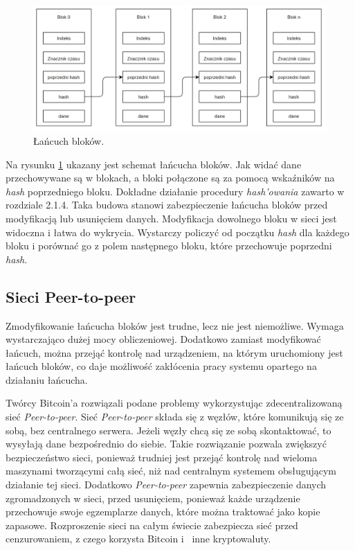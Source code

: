 \documentclass[a4paper,12pt]{book}
\begin{document}
\begin{figure}[h]
	\centering
	\includegraphics[width=\textwidth]{images/łańcuch_bloków.jpg}
	\caption {Łańcuch bloków.}\label{blocksschain}
\end {figure}

Na rysunku \ref{blocksschain} ukazany jest schemat łańcucha bloków. Jak widać dane przechowywane są w blokach, a bloki połączone są za pomocą wskaźników na \textit{hash} poprzedniego bloku. Dokładne działanie procedury \textit{hash'owania} zawarto w rozdziale 2.1.4. Taka budowa stanowi zabezpieczenie łańcucha bloków przed modyfikacją lub usunięciem danych. Modyfikacja dowolnego bloku w sieci jest widoczna i łatwa do wykrycia. Wystarczy policzyć od początku \textit{hash} dla każdego bloku i porównać go z polem następnego bloku, które przechowuje poprzedni \textit{hash}.

\subsection{Sieci Peer-to-peer}

Zmodyfikowanie łańcucha bloków jest trudne, lecz nie jest niemożliwe. Wymaga wystarczająco dużej mocy obliczeniowej. Dodatkowo zamiast modyfikować łańcuch, można przejąć kontrolę nad urządzeniem, na którym uruchomiony jest łańcuch bloków, co daje możliwość zakłócenia pracy systemu opartego na działaniu łańcucha.

Twórcy Bitcoin'a rozwiązali podane problemy wykorzystując zdecentralizowaną sieć \textit{Peer-to-peer}. Sieć \textit{Peer-to-peer} składa się z węzłów, które komunikują się ze sobą, bez centralnego serwera. Jeżeli węzły chcą się ze sobą skontaktować, to wysyłają dane bezpośrednio do siebie. Takie rozwiązanie pozwala zwiększyć bezpieczeństwo sieci, ponieważ trudniej jest przejąć kontrolę nad wieloma maszynami tworzącymi całą sieć, niż nad centralnym systemem obsługującym działanie tej sieci. Dodatkowo \textit{Peer-to-peer} zapewnia zabezpieczenie danych zgromadzonych w sieci, przed usunięciem, ponieważ każde urządzenie przechowuje swoje egzemplarze danych, które można traktować jako kopie zapasowe. 
Rozproszenie sieci na całym świecie zabezpiecza sieć przed cenzurowaniem, z czego korzysta Bitcoin i~ inne kryptowaluty.
\end{document}
